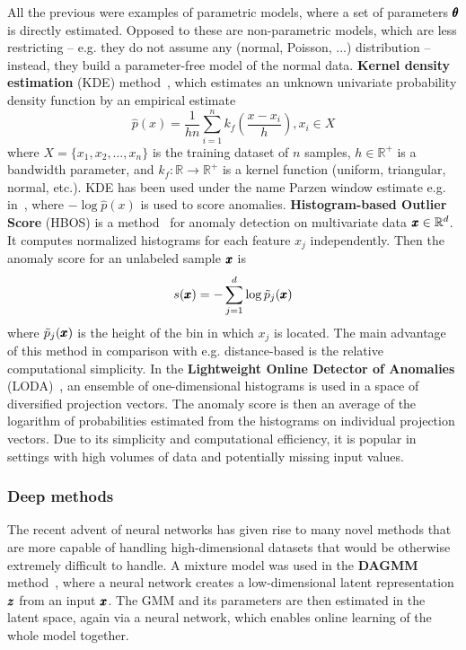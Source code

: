 All the previous were examples of parametric models, where a set of parameters $\pmb{{\theta}}$ is directly estimated. Opposed to these are non-parametric models, which are less restricting  -- e.g. they do not assume any (normal, Poisson, ...) distribution -- instead, they build a parameter-free model of the normal data. \textbf{Kernel density estimation} (KDE) method~\cite{parzen1962estimation}, which estimates an unknown univariate probability density function by an empirical estimate
\begin{equation} \label{eq:kde}
	\hat{p}(x) = \frac{1}{hn} \sum_{i=1}^n k_f \left( \frac{x-x_i}{h} \right), x_i \in X
\end{equation}
where $X = \lbrace x_1, x_2, \ldots, x_n \rbrace$ is the training dataset of $n$ samples, $h \in \mathbb{R}^+$ is a bandwidth parameter, and $k_f:\mathbb{R} \rightarrow \mathbb{R}^+$ is a kernel function (uniform, triangular, normal, etc.). KDE has been used under the name Parzen window estimate e.g. in~\cite{tarassenko1995novelty,yeung2002parzen}, where $-\log \hat{p}(x)$ is used to score anomalies. \textbf{Histogram-based Outlier Score} (HBOS) is a method~\cite{goldstein2012histogram} for anomaly detection on multivariate data $\pmb{{x}} \in \mathbb{R}^d$. It computes normalized histograms for each feature $x_j$ independently. Then the anomaly score for an unlabeled sample $\pmb{{x}}$ is
\begin{equation} \label{eq:hbos}
	s(\pmb{{x}}) =  -\sum_{j=1}^d \log \tilde{p}_j(\pmb{{x}})
\end{equation}
where $\tilde{p}_j(\pmb{{x}})$ is the height of the bin in which $x_j$ is located. The main advantage of this method in comparison with e.g. distance-based is the relative computational simplicity. In the \textbf{Lightweight Online Detector of Anomalies} (LODA)~\cite{pevny2016loda}, an ensemble of one-dimensional histograms is used in a space of diversified projection vectors. The anomaly score is then an average of the logarithm of probabilities estimated from the histograms on individual projection vectors. Due to its simplicity and computational efficiency, it is popular in settings with high volumes of data and potentially missing input values.

\subsubsection{Deep methods}
The recent advent of neural networks has given rise to many novel methods that are more capable of handling high-dimensional datasets that would be otherwise extremely difficult to handle. A mixture model was used in the \textbf{DAGMM} method~\cite{zong2018deep}, where a neural network creates a low-dimensional latent representation $\pmb{{z}}$ from an input $\pmb{{x}}$. The GMM and its parameters are then estimated in the latent space, again via a neural network, which enables online learning of the whole model together.

